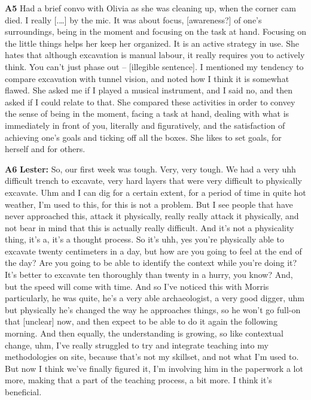 \documentclass{article}
\begin{document}
\noindent\textbf{A5}\label{sec-A5}\newline
Had a brief convo with Olivia as she was cleaning up, when the corner
cam died. I really {[}.\ldots{]} by the mic. It was about focus,
{[}awareness?{]} of one's surroundings, being in the moment and focusing
on the task at hand. Focusing on the little things helps her keep her
organized. It is an active strategy in use. She hates that although
excavation is manual labour, it really requires you to actively think.
You can't just phase out -- {[}illegible sentence{]}. I mentioned my
tendency to compare excavation with tunnel vision, and noted how I think
it is somewhat flawed. She asked me if I played a musical instrument,
and I said no, and then asked if I could relate to that. She compared
these activities in order to convey the sense of being in the moment,
facing a task at hand, dealing with what is immediately in front of you,
literally and figuratively, and the satisfaction of achieving one's
goals and ticking off all the boxes. She likes to set goals, for herself
and for others.\newline

\noindent\textbf{A6}\label{sec-A6}\newline
\textbf{Lester:} So, our first week was tough. Very, very tough. We had
a very uhh difficult trench to excavate, very hard layers that were very
difficult to physically excavate. Uhm and I can dig for a certain
extent, for a period of time in quite hot weather, I'm used to this, for
this is not a problem. But I see people that have never approached this,
attack it physically, really really attack it physically, and not bear
in mind that this is actually really difficult. And it's not a
physicality thing, it's a, it's a thought process. So it's uhh, yes
you're physically able to excavate twenty centimeters in a day, but how
are you going to feel at the end of the day? Are you going to be able to
identify the context while you're doing it? It's better to excavate ten
thoroughly than twenty in a hurry, you know? And, but the speed will
come with time. And so I've noticed this with Morris particularly, he
was quite, he's a very able archaeologist, a very good digger, uhm but
physically he's changed the way he approaches things, so he won't go
full-on that {[}unclear{]} now, and then expect to be able to do it
again the following morning. And then equally, the understanding is
growing, so like contextual change, uhm, I've really struggled to try
and integrate teaching into my methodologies on site, because that's not
my skillset, and not what I'm used to. But now I think we've finally
figured it, I'm involving him in the paperwork a lot more, making that a
part of the teaching process, a bit more. I think it's beneficial.\newline
\end{document}
